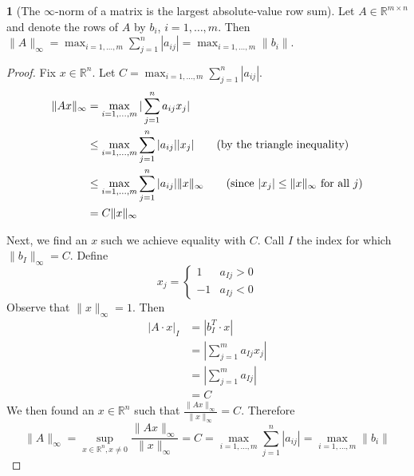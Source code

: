 \documentclass[12pt]{article}
\theoremstyle{definition}
\newcommand{\R}{\mathbb{R}}
\newcommand{\norm}[1]{\lVert#1\rVert}
\newtheorem{theorem}{\color{ForestGreen}{\textbf{Theorem}}}
\theoremstyle{definition}
\begin{document}
\begin{theorem}[The $\infty$-norm of a matrix is the largest absolute-value row sum]
Let $A \in \R^{m \times n }$ and denote the rows of $A$ by $b_i$, $i=1, \ldots, m$. Then $\norm{A}_{\infty} = \max_{i=1, \ldots, m} \sum_{j=1}^{n} |a_{ij}| =  \max_{i=1, \ldots, m} \norm{b_i}$.
\end{theorem}
\begin{proof}
Fix $x \in \R^n$. Let $C = \max_{i=1, \ldots, m} \sum_{j=1}^{n} |a_{ij}|$.
\begin{align*}
	\norm{Ax}_{\infty} &= \max_{i=1,\ldots,m} |\sum_{j=1}^n a_{ij} x_j| \\
	&\leq \max_{i=1,\ldots,m} \sum_{j=1}^n |a_{ij}| |x_j| \tag{by the triangle inequality} \\
	&\leq  \max_{i=1,\ldots,m} \sum_{j=1}^n |a_{ij}| \norm{x}_{\infty} \tag{since $|x_j| \leq \norm{x}_{\infty}$ for all $j$}\\
	&= C \norm{x}_{\infty}
\end{align*}

Next, we find an $x$ such we achieve equality with $C$. Call $I$ the index for which $\norm{b_I}_\infty = C$. Define
\begin{equation}
	x_j = 
	\begin{cases} 
      1 & a_{Ij} > 0 \\
      -1 & a_{Ij} < 0
   \end{cases}
\end{equation}
Observe that $\norm{x}_\infty = 1$. Then
\begin{align*}
	|A\cdot x|_I &= |b_I^T \cdot x| \\
	&=  |\sum_{j=1}^m a_{Ij} x_j | \\
	&= |\sum_{j=1}^m a_{Ij}| \\
	&= C
\end{align*}
We then found an $x \in \R^n$ such that $\frac{\norm{Ax}_\infty}{\norm{x}_\infty} = C$. Therefore 
\begin{equation}
	\norm{A}_\infty = \sup_{x \in \R^n, x\neq 0} \frac{\norm{Ax}_\infty}{\norm{x}_\infty} = C = \max_{i=1, \ldots, m} \sum_{j=1}^{n} |a_{ij}| =  \max_{i=1, \ldots, m} \norm{b_i}
\end{equation}
\end{proof}
\end{document}
